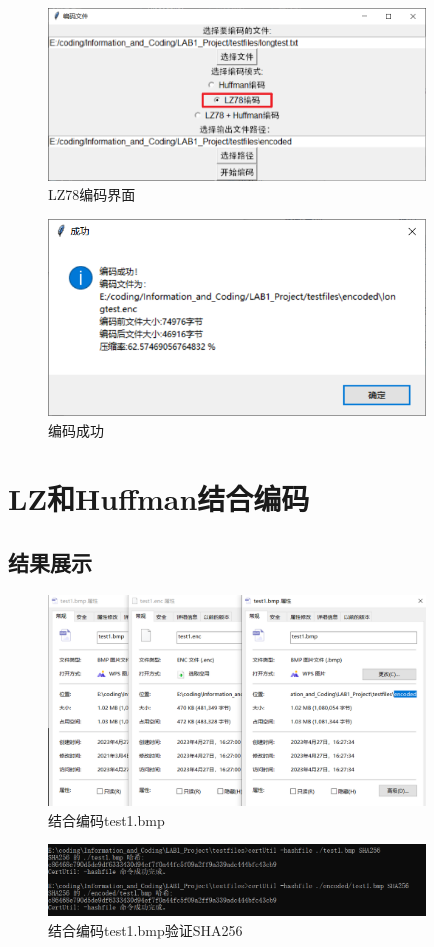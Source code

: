 \documentclass[12pt, a4paper]{ctexart}
\begin{document}
    \begin{figure}[H]
    \centering
    \includegraphics[width=10cm]{./pic/6-1.png}		
    \caption{LZ78编码界面}
    \end{figure}
    \begin{figure}[H]
    \centering
    \includegraphics[width=10cm]{./pic/6-2.png}		
    \caption{编码成功}
    \end{figure}

\section{LZ和Huffman结合编码}
    \subsection{结果展示}
    \begin{figure}[H]
    \centering
    \includegraphics[width=10cm]{./pic/7-1.png}		
    \caption{结合编码test1.bmp}
    \end{figure}
    \begin{figure}[H]
    \centering
    \includegraphics[width=10cm]{./pic/7-2.png}		
    \caption{结合编码test1.bmp验证SHA256}
    \end{figure}
\end{document}
